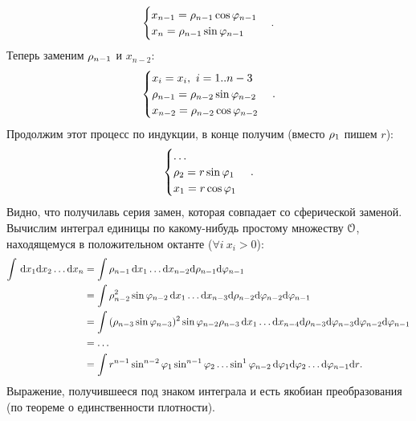 \begin{example}
\begin{itemize}
\[\begin{cases}
                    x_{n - 1} = \rho_{n - 1} \cos{\varphi_{n - 1}} \\
                    x_n = \rho_{n - 1} \sin{\varphi_{n - 1}}
                \end{cases}
            .\]
            Теперь заменим $\rho_{n - 1}$ и $x_{n - 2}$:
            \[
                \begin{cases}
                    x_i = x_i,~ i = 1..{n-3} \\
                    \rho_{n - 1} = \rho_{n - 2} \sin{\varphi_{n - 2}} \\
                    x_{n - 2} = \rho_{n - 2} \cos{\varphi_{n - 2}}
                \end{cases}
            .\]
            Продолжим этот процесс по индукции, в конце получим (вместо $\rho_1$ пишем $r$):
            \[
                \begin{cases}
                    \ldots \\
                    \rho_2 = r \sin{\varphi_1} \\
                    x_1 = r \cos{\varphi_1}
                \end{cases}
            .\]
            Видно, что получилавь серия замен, которая совпадает со сферической заменой.
            Вычислим интеграл единицы по какому-нибудь простому множеству $\mathcal{O}$, находящемуся в
            положительном октанте ($\forall i~ x_i > 0$):
            \begin{align*}
                \int\limits{\,\mathrm{d}x_1 \mathrm{d}x_2 \ldots \mathrm{d}x_n} 
                &= \int\limits{\rho_{n - 1} \,\mathrm{d}x_1 \ldots \mathrm{d}x_{n - 2} \mathrm{d}\rho_{n - 1} \mathrm{d}\varphi_{n - 1}} \\
                &= \int\limits{\rho^2_{n - 2} \sin{\varphi_{n - 2}} \,\mathrm{d}x_1 \ldots \mathrm{d}x_{n - 3} \mathrm{d}\rho_{n - 2} 
                    \mathrm{d}\varphi_{n - 2} \mathrm{d}\varphi_{n - 1}} \\
                &= \int\limits{(\rho_{n - 3} \sin{\varphi_{n - 3}})^2 \sin{\varphi_{n - 2}} \rho_{n - 3} 
                    \,\mathrm{d}x_1 \ldots \mathrm{d}x_{n - 4} \mathrm{d}\rho_{n - 3} \mathrm{d}\varphi_{n - 3} \mathrm{d}\varphi_{n - 2} \mathrm{d}\varphi_{n - 1}} \\
                &= \ldots \\
                &= \int\limits{r^{n - 1} \sin^{n - 2}{\varphi_1} \sin^{n - 1}{\varphi_2} \ldots \sin^1{\varphi_{n - 2}}
                    \,\mathrm{d}\varphi_1 \mathrm{d}\varphi_2 \ldots \mathrm{d}\varphi_{n - 1} \mathrm{d}r} 
            .\end{align*}
            Выражение, получившееся под знаком интеграла и есть якобиан преобразования (по теореме о
            единственности плотности).
    \end{itemize}
\end{example}

